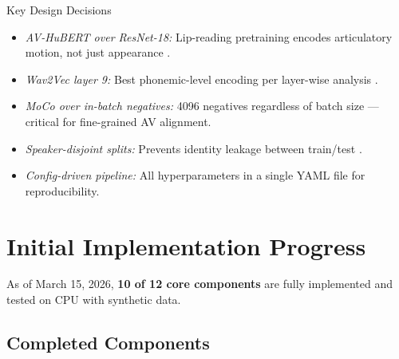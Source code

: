 \documentclass[12pt, letterpaper]{article}
\begin{document}
\begin{resultbox}{Key Design Decisions}
\begin{itemize}[leftmargin=1.5em, topsep=0pt]
    \item \textit{AV-HuBERT over ResNet-18:} Lip-reading pretraining encodes articulatory motion, not just appearance \cite{shi2022}.
    \item \textit{Wav2Vec layer 9:} Best phonemic-level encoding per layer-wise analysis \cite{pasad2021}.
    \item \textit{MoCo over in-batch negatives:} 4096 negatives regardless of batch size — critical for fine-grained AV alignment.
    \item \textit{Speaker-disjoint splits:} Prevents identity leakage between train/test \cite{khalid2021}.
    \item \textit{Config-driven pipeline:} All hyperparameters in a single YAML file for reproducibility.
\end{itemize}
\end{resultbox}

\section{Initial Implementation Progress}

As of March 15, 2026, \textbf{10 of 12 core components} are fully implemented and tested on CPU with synthetic data.

\subsection{Completed Components}
\end{document}
